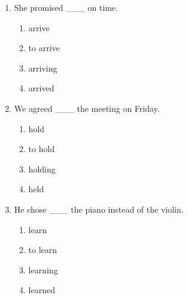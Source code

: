 \documentclass[11pt,a4paper]{ctexart}
\begin{document}
\begin{enumerate}[leftmargin=*,itemsep=4pt]
\begin{enumerate}[label=\Alph*.,leftmargin=2em,itemsep=1pt,topsep=2pt]
\item locked
\end{enumerate}
\item She promised \_\_\_ on time.
\begin{enumerate}[label=\Alph*.,leftmargin=2em,itemsep=1pt,topsep=2pt]
\item arrive
\item to arrive
\item arriving
\item arrived
\end{enumerate}
\item We agreed \_\_\_ the meeting on Friday.
\begin{enumerate}[label=\Alph*.,leftmargin=2em,itemsep=1pt,topsep=2pt]
\item hold
\item to hold
\item holding
\item held
\end{enumerate}
\item He chose \_\_\_ the piano instead of the violin.
\begin{enumerate}[label=\Alph*.,leftmargin=2em,itemsep=1pt,topsep=2pt]
\item learn
\item to learn
\item learning
\item learned
\end{enumerate}
\end{enumerate}
\end{document}
